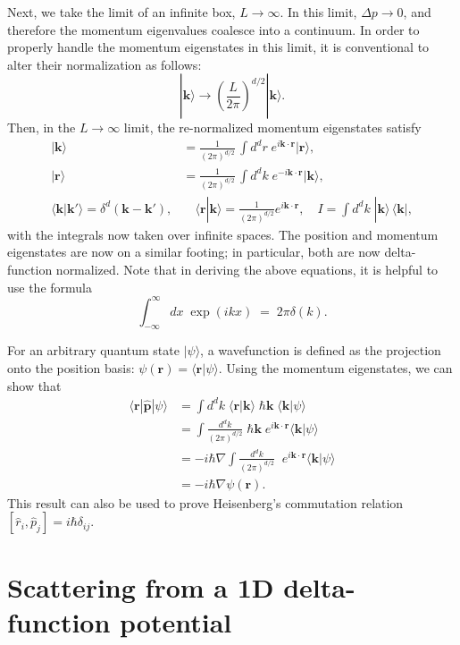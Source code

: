 \documentclass[pra,12pt]{revtex4}
\begin{document}
Next, we take the limit of an infinite box, $L \rightarrow \infty$.
In this limit, $\Delta p \rightarrow 0$, and therefore the momentum
eigenvalues coalesce into a continuum.  In order to properly handle
the momentum eigenstates in this limit, it is conventional to alter
their normalization as follows:
$$|\mathbf{k}\rangle \rightarrow \left(\frac{L}{2\pi}\right)^{d/2} |\mathbf{k}\rangle.$$
Then, in the $L\rightarrow\infty$ limit, the re-normalized momentum
eigenstates satisfy
$$\boxed{\begin{aligned} |\mathbf{k}\rangle &= \frac{1}{(2\pi)^{d/2}} \, \int d^dr \; e^{i\mathbf{k}\cdot\mathbf{r}} |\mathbf{r}\rangle, \\ |\mathbf{r}\rangle &= \frac{1}{(2\pi)^{d/2}} \, \int d^dk \; e^{-i\mathbf{k}\cdot\mathbf{r}} |\mathbf{k}\rangle, \\\langle\mathbf{k}|\mathbf{k}'\rangle = \delta^d(\mathbf{k}-\mathbf{k}'),& \quad \langle\mathbf{r}|\mathbf{k}\rangle = \frac{1}{(2\pi)^{d/2}} e^{i\mathbf{k}\cdot\mathbf{r}}, \quad I = \int d^dk \;|\mathbf{k}\rangle\,\langle\mathbf{k}|,\end{aligned}}$$
with the integrals now taken over infinite spaces.  The position and
momentum eigenstates are now on a similar footing; in particular, both
are now delta-function normalized.  Note that in deriving the above
equations, it is helpful to use the formula
$$\int_{-\infty}^\infty dx\; \exp(ikx) \;=\; 2\pi\delta(k).$$

For an arbitrary quantum state $|\psi\rangle$, a wavefunction is
defined as the projection onto the position basis: $\psi(\mathbf{r}) =
\langle \mathbf{r}|\psi\rangle$.  Using the momentum eigenstates, we can
show that
$$\begin{aligned}\langle \mathbf{r}|\hat{\mathbf{p}}|\psi\rangle &=  \int d^dk \; \langle\mathbf{r}|\mathbf{k}\rangle \; \hbar\mathbf{k} \; \langle\mathbf{k}|\psi\rangle \\ &=  \int \frac{d^dk}{(2\pi)^{d/2}}\; \hbar\mathbf{k} \;e^{i\mathbf{k}\cdot\mathbf{r}} \langle\mathbf{k}|\psi\rangle \\ &=  -i\hbar\nabla \int \frac{d^dk}{(2\pi)^{d/2}}\; \;e^{i\mathbf{k}\cdot\mathbf{r}} \langle\mathbf{k}|\psi\rangle \\ &= -i\hbar \nabla\psi(\mathbf{r}).\end{aligned}$$
This result can also be used to prove Heisenberg's commutation relation
$[\hat{r}_i, \hat{p}_j] = i\hbar\delta_{ij}$.

\section{Scattering from a 1D delta-function potential}
\label{sec:1dscatter}
\end{document}

